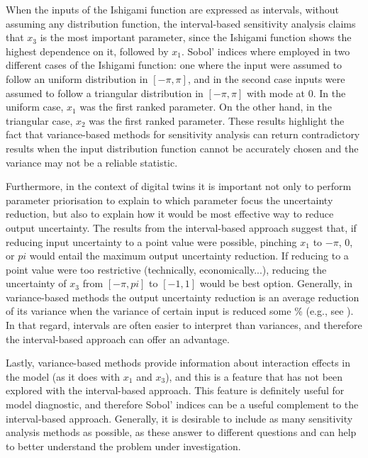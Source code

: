 \documentclass[twocolumn]{rps-esrel2022}
\begin{document}
When the inputs of the Ishigami function are expressed as intervals, without assuming any distribution function,
the interval-based sensitivity analysis claims that $x_3$ is the most important parameter, since the Ishigami function
shows the highest dependence on it, followed by $x_1$.
Sobol' indices where employed in two different cases of the Ishigami function: one where the input were assumed to follow
an uniform distribution in $[-\pi,\pi]$, and in the second case inputs were assumed to follow a triangular distribution
in $[-\pi,\pi]$ with mode at $0$.
In the uniform case, $x_1$ was the first ranked parameter.
On the other hand, in the triangular case, $x_2$ was the first ranked parameter.
These results highlight the fact that variance-based methods for sensitivity analysis can return contradictory results
when the input distribution function cannot be accurately chosen and the variance may not be a reliable statistic.

Furthermore, in the context of digital twins it is important not only to perform parameter priorisation to explain to which
parameter focus the uncertainty reduction, but also to explain how it would be most effective way to reduce output uncertainty.
The results from the interval-based approach suggest that, if reducing input uncertainty to a point value were possible, pinching
$x_1$ to $-\pi$, $0$, or $pi$ would entail the maximum output uncertainty reduction.
If reducing to a point value were too restrictive (technically, economically...), reducing the uncertainty of $x_3$ from $[-\pi,pi]$
to $[-1,1]$ would be best option.
Generally, in variance-based methods the output uncertainty reduction is an average reduction of its variance when the variance of certain input
is reduced some \% (e.g., see \cite{allaire2012variance}).
In that regard, intervals are often easier to interpret than variances, and therefore the interval-based approach can offer
an advantage.

Lastly, variance-based methods provide information about interaction effects in the model (as it does with $x_1$ and $x_3$),
and this is a feature that has not been explored with the interval-based approach.
This feature is definitely useful for model diagnostic, and therefore Sobol' indices can be a useful complement to the
interval-based approach.
Generally, it is desirable to include as many sensitivity analysis methods as possible, as these answer to different questions
and can help to better understand the problem under investigation.
\end{document}
